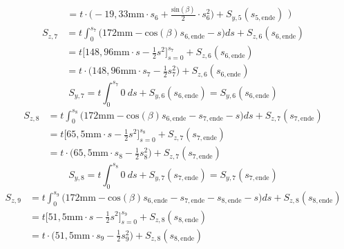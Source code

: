 \begin{itemize}
\begin{equation}
\begin{split}
	&= t\cdot\bigg(-19,33\mathrm{mm}\cdot s_6 + \frac{\mathrm{sin}(\beta)}{2}\cdot s^2_6\bigg) + S_{y,5}(s_{5,\mathrm{ende}})
	\end{split})
\end{equation}
\begin{equation}
	\begin{split}
		S_{z,7} &= t\int_{0}^{s_7}\bigg(172\mathrm{mm}-\mathrm{cos}(\beta)s_{6,\mathrm{ende}}-s\bigg)ds + S_{z,6}(s_{6,\mathrm{ende}})\\\
		&= t\bigg[148,96\mathrm{mm}\cdot s-\frac{1}{2}s^2\bigg]_{s=0}^{s_7} + S_{z,6}(s_{6,\mathrm{ende}})\\\
		&= t\cdot\bigg(148,96\mathrm{mm}\cdot s_7-\frac{1}{2}s^2_7\bigg) + S_{z,6}(s_{6,\mathrm{ende}})
	\end{split}
\end{equation}
\begin{equation}
	S_{y,7} = t\int_{0}^{s_7}0\ ds + S_{y,6}(s_{6,\mathrm{ende}}) = S_{y,6}(s_{6,\mathrm{ende}})
\end{equation}
\begin{equation}
\begin{split}
	S_{z,8} &= t\int_{0}^{s_8}\bigg(172\mathrm{mm}-\mathrm{cos}(\beta)s_{6,\mathrm{ende}}-s_{7,\mathrm{ende}}-s\bigg)ds + S_{z,7}(s_{7,\mathrm{ende}})\\\
	&= t\bigg[65,5\mathrm{mm}\cdot s-\frac{1}{2}s^2\bigg]_{s=0}^{s_8} + S_{z,7}(s_{7,\mathrm{ende}})\\\
	&= t\cdot\bigg(65,5\mathrm{mm}\cdot s_8-\frac{1}{2}s^2_8\bigg) + S_{z,7}(s_{7,\mathrm{ende}})
\end{split}
\end{equation}
\begin{equation}
	S_{y,8} = t\int_{0}^{s_8}0\ ds + S_{y,7}(s_{7,\mathrm{ende}}) =S_{y,7}(s_{7,\mathrm{ende}})
\end{equation}
\begin{equation}
		\begin{split}
		S_{z,9} &= t\int_{0}^{s_9}\bigg(172\mathrm{mm}-\mathrm{cos}(\beta)s_{6,\mathrm{ende}}-s_{7,\mathrm{ende}}-s_{8,\mathrm{ende}}-s\bigg)ds + S_{z,8}(s_{8,\mathrm{ende}})\\\
		&= t\bigg[51,5\mathrm{mm}\cdot s-\frac{1}{2}s^2\bigg]_{s=0}^{s_9} + S_{z,8}(s_{8,\mathrm{ende}})\\\
		&= t\cdot\bigg(51,5\mathrm{mm}\cdot s_9-\frac{1}{2}s^2_9\bigg) + S_{z,8}(s_{8,\mathrm{ende}})
	\end{split}
\end{equation}

\end{itemize}
